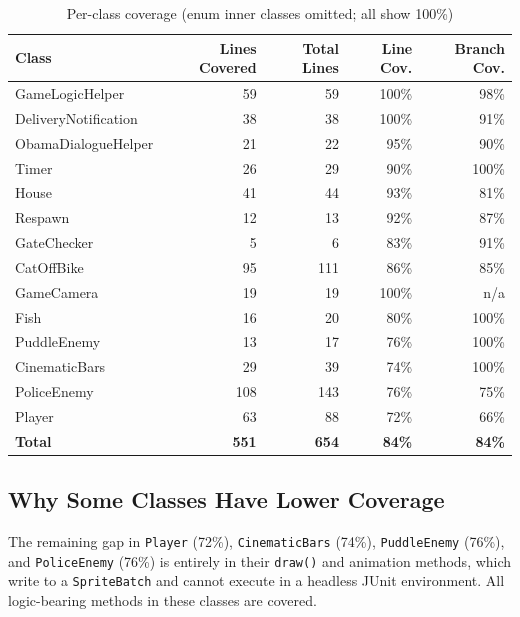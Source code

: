 \documentclass[12pt]{article}
\begin{document}
\renewcommand{\arraystretch}{1.1}
\begin{table}[H]
\centering
\normalsize
\begin{tabular}{lrrrr}
\toprule
\textbf{Class} & \textbf{Lines Covered} & \textbf{Total Lines} & \textbf{Line Cov.} & \textbf{Branch Cov.} \\
\midrule
GameLogicHelper      & 59  & 59  & 100\% & 98\% \\
DeliveryNotification & 38  & 38  & 100\% & 91\% \\
ObamaDialogueHelper  & 21  & 22  & 95\%  & 90\% \\
Timer                & 26  & 29  & 90\%  & 100\% \\
House                & 41  & 44  & 93\%  & 81\% \\
Respawn              & 12  & 13  & 92\%  & 87\% \\
GateChecker          &  5  &  6  & 83\%  & 91\% \\
CatOffBike           & 95  & 111 & 86\%  & 85\% \\
GameCamera           & 19  & 19  & 100\% & n/a \\
Fish                 & 16  & 20  & 80\%  & 100\% \\
PuddleEnemy          & 13  & 17  & 76\%  & 100\% \\
CinematicBars        & 29  & 39  & 74\%  & 100\% \\
PoliceEnemy          & 108 & 143 & 76\%  & 75\% \\
Player               & 63  & 88  & 72\%  & 66\% \\
\midrule
\textbf{Total}       & \textbf{551} & \textbf{654} & \textbf{84\%} & \textbf{84\%} \\
\bottomrule
\end{tabular}
\caption{Per-class coverage (enum inner classes omitted; all show 100\%)}
\end{table}

\subsection{Why Some Classes Have Lower Coverage}

The remaining gap in \texttt{Player} (72\%), \texttt{CinematicBars} (74\%), \texttt{PuddleEnemy} (76\%), and \texttt{PoliceEnemy} (76\%) is entirely in their \texttt{draw()} and animation methods, which write to a \texttt{SpriteBatch} and cannot execute in a headless JUnit environment. All logic-bearing methods in these classes are covered.
\end{document}
